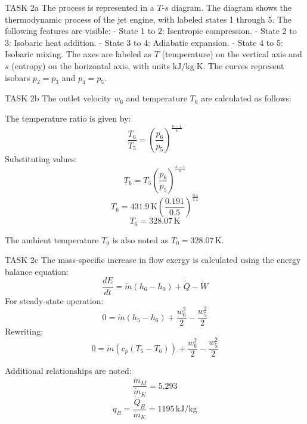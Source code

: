 TASK 2a  
The process is represented in a \( T \)-\( s \) diagram. The diagram shows the thermodynamic process of the jet engine, with labeled states 1 through 5. The following features are visible:  
- State 1 to 2: Isentropic compression.  
- State 2 to 3: Isobaric heat addition.  
- State 3 to 4: Adiabatic expansion.  
- State 4 to 5: Isobaric mixing.  
The axes are labeled as \( T \) (temperature) on the vertical axis and \( s \) (entropy) on the horizontal axis, with units \( \text{kJ/kg·K} \). The curves represent isobars \( p_2 = p_3 \) and \( p_4 = p_5 \).  

TASK 2b  
The outlet velocity \( w_6 \) and temperature \( T_6 \) are calculated as follows:  

The temperature ratio is given by:  
\[
\frac{T_6}{T_5} = \left( \frac{p_6}{p_5} \right)^{\frac{\kappa - 1}{\kappa}}
\]  
Substituting values:  
\[
T_6 = T_5 \left( \frac{p_6}{p_5} \right)^{\frac{\kappa - 1}{\kappa}}
\]  
\[
T_6 = 431.9 \, \text{K} \left( \frac{0.191}{0.5} \right)^{\frac{0.4}{1.4}}
\]  
\[
T_6 = 328.07 \, \text{K}
\]  

The ambient temperature \( T_0 \) is also noted as \( T_0 = 328.07 \, \text{K} \).  

TASK 2c  
The mass-specific increase in flow exergy is calculated using the energy balance equation:  
\[
\frac{dE}{dt} = \dot{m} \left( h_6 - h_0 \right) + \dot{Q} - \dot{W}
\]  
For steady-state operation:  
\[
0 = \dot{m} \left( h_5 - h_6 \right) + \frac{w_6^2}{2} - \frac{w_5^2}{2}
\]  
Rewriting:  
\[
0 = \dot{m} \left( c_p (T_5 - T_6) \right) + \frac{w_6^2}{2} - \frac{w_5^2}{2}
\]  

Additional relationships are noted:  
\[
\frac{\dot{m}_M}{\dot{m}_K} = 5.293
\]  
\[
q_B = \frac{\dot{Q}_B}{\dot{m}_K} = 1195 \, \text{kJ/kg}
\]